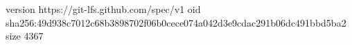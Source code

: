 version https://git-lfs.github.com/spec/v1
oid sha256:49d938c7012c68b3898702f06b0cece074a042d3e9cdac291b06dc491bbd5ba2
size 4367
